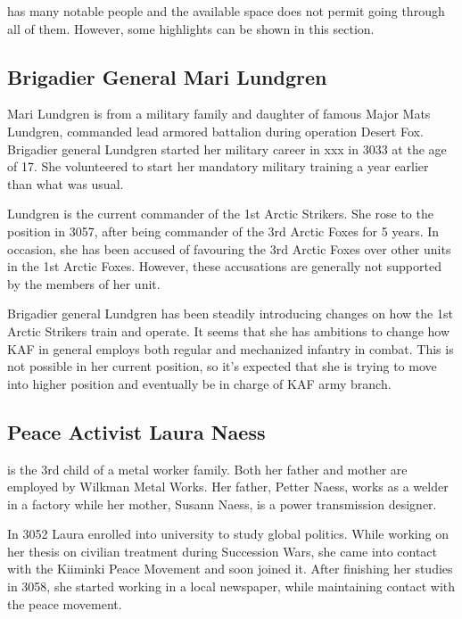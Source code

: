 \documentclass{tufte-book}
\begin{document}
 has many notable people and the available
space does not permit going through all of them. However, some highlights
can be shown in this section.

\subsection{Brigadier General Mari Lundgren}
\label{sc:bio-mari-lundgren}

 Mari Lundgren is from a military family and
daughter of famous Major Mats Lundgren, commanded lead armored battalion during
operation Desert Fox. Brigadier general Lundgren started her military career
in xxx in 3033 at the age of 17. She volunteered to start her mandatory
military training a year earlier than what was usual.

Lundgren is the current commander of the
1st Arctic Strikers. She rose to the position in 3057, after being commander of
the 3rd Arctic Foxes for 5 years. In occasion, she has been accused of
favouring the 3rd Arctic Foxes over other units in the 1st Arctic Foxes.
However, these accusations are generally not supported by the members of her
unit.

Brigadier general Lundgren has been steadily introducing changes on how the
1st Arctic Strikers train and operate. It seems that she has ambitions to
change how KAF in general employs both regular and mechanized infantry in
combat. This is not possible in her current position, so it's expected that
she is trying to move into higher position and eventually be in charge of
KAF army branch.

\subsection{Peace Activist Laura Naess}
\label{sc:laura-naess}

 is the 3rd child of a metal worker family. Both her
father and mother are employed by Wilkman Metal Works. Her father, Petter
Naess, works as a welder in a factory while her mother, Susann Naess, is a
power transmission designer.

In 3052 Laura enrolled into university to study global politics. While working
on her thesis on civilian treatment during Succession Wars, she came into
contact with the Kiiminki Peace Movement and soon joined it. After finishing
her studies in 3058, she started working in a local newspaper, while
maintaining contact with the peace movement.
\end{document}
